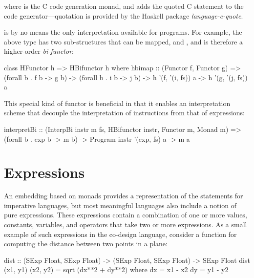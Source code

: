 \documentclass[../paper.tex]{subfiles}
\begin{document}

\noindent where  is the C code generation monad, and  adds the quoted C statement to the code generator---quotation is provided by the Haskell package \textit{language-c-quote}.

 is by no means the only interpretation available for programs. For example, the above  type has two sub-structures that can be mapped,  and , and is therefore a higher-order \textit{bi-functor}:

\begin{code}
class HFunctor h => HBifunctor h where
  hbimap :: (Functor f, Functor g)
    => (forall b . f b -> g b)
    -> (forall b . i b -> j b)
    -> h '(f, '(i, fs)) a
    -> h '(g, '(j, fs)) a
\end{code}

\noindent This special kind of functor is beneficial in that it enables an interpretation scheme that decouple the interpretation of instructions from that of expressions:

\begin{code}
interpretBi :: (InterpBi instr m fs, HBifunctor instr, Functor m, Monad m)
  => (forall b . exp b -> m b) -> Program instr '(exp, fs) a -> m a
\end{code}

\section{Expressions}
\label{expr}

An embedding based on monads provides a representation of the statements for imperative languages, but most meaningful languages also include a notion of pure expressions. These expressions contain a combination of one or more values, constants, variables, and operators that take two or more expressions. As a small example of such expressions in the co-design language, consider a function for computing the distance between two points in a plane:

\begin{code}
dist :: (SExp Float, SExp Float) -> (SExp Float, SExp Float) -> SExp Float
dist (x1, y1) (x2, y2) = sqrt (dx**2 + dy**2)
  where
    dx = x1 - x2
    dy = y1 - y2
\end{code}
\end{document}
